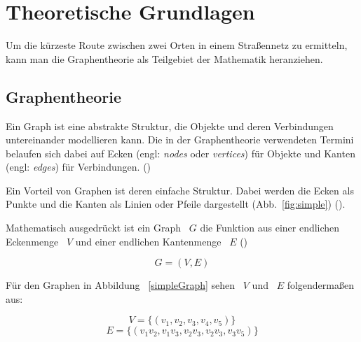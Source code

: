 \section{Theoretische Grundlagen}

Um die kürzeste Route zwischen zwei Orten in einem Straßennetz zu ermitteln, kann man die
Graphentheorie als Teilgebiet der Mathematik heranziehen.

\subsection{Graphentheorie}

Ein Graph ist eine abstrakte Struktur, die Objekte und deren Verbindungen untereinander modellieren kann.
Die in der Graphentheorie verwendeten Termini belaufen sich dabei auf Ecken (engl: \textit{nodes} oder \textit{vertices}) für Objekte und Kanten (engl: \textit{edges}) für Verbindungen.
(\cite[49]{kurt})

Ein Vorteil von Graphen ist deren einfache Struktur.
Dabei werden die Ecken als Punkte und die Kanten als Linien oder Pfeile dargestellt (Abb.~\ref{fig:simple}) (\cite[49]{kurt}).

Mathematisch ausgedrückt ist ein Graph ~$G$ die Funktion aus einer endlichen Eckenmenge ~$V$ und einer endlichen Kantenmenge ~$E$ (\cite[4]{theory})

	$$G = (V,E)$$

Für den Graphen in Abbildung ~\ref{simpleGraph} sehen ~$V$ und ~$E$ folgendermaßen aus:

$$V = \{(v_{1},v_{2},v_{3},v_{4},v_{5})\} $$
$$E = \{(v_{1}v_{2},v_{1}v_{3},v_{2}v_{3},v_{2}v_{3},v_{3}v_{5})\} $$

